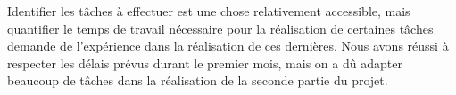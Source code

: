 Identifier les tâches à effectuer est une chose relativement accessible, mais quantifier le temps de travail nécessaire pour la réalisation de certaines tâches demande de l'expérience dans la réalisation de ces dernières. Nous avons réussi à respecter les délais prévus durant le premier mois, mais on a dû adapter beaucoup de tâches dans la réalisation de la seconde partie du projet. 




